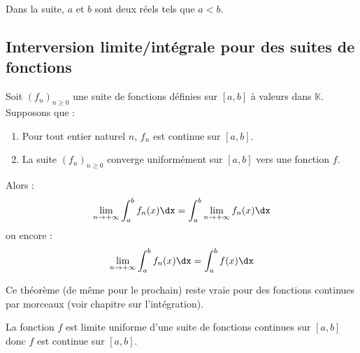 \documentclass[a4paper,10pt]{report}
\begin{document}
\noindent Dans la suite, $a$ et $b$ sont deux réels tels que $a<b$.

\subsection{Interversion limite/intégrale pour des suites de fonctions}

\begin{thm} Soit $(f_n)_{n \geq 0}$ une suite de fonctions définies sur $[a,b]$ à valeurs dans $\mathbb{K}$. Supposons que :

\begin{enumerate}
\item Pour tout entier naturel $n$, $f_n$ est continue sur $[a,b]$.
\item La suite $(f_n)_{n \geq 0}$ converge uniformément sur $[a,b]$ vers une fonction $f$.
\end{enumerate}
Alors :
$$ \lim_{n \rightarrow + \infty} \int_{a}^b f_n(x) \dx = \int_{a}^b \lim_{n \rightarrow + \infty} f_n(x) \dx$$
ou encore :
$$  \lim_{n \rightarrow + \infty} \int_{a}^b f_n(x) \dx = \int_{a}^b f(x) \dx$$
\end{thm}

\begin{rem} Ce théorème (de même pour le prochain) reste vraie pour des fonctions continues par morceaux (voir chapitre sur l'intégration).
\end{rem}

\begin{preuve} La fonction $f$ est limite uniforme d'une suite de fonctions continues sur $[a,b]$ donc $f$ est continue sur $[a,b]$. 
%
%

\vspace{9cm}
\end{preuve}
\end{document}
